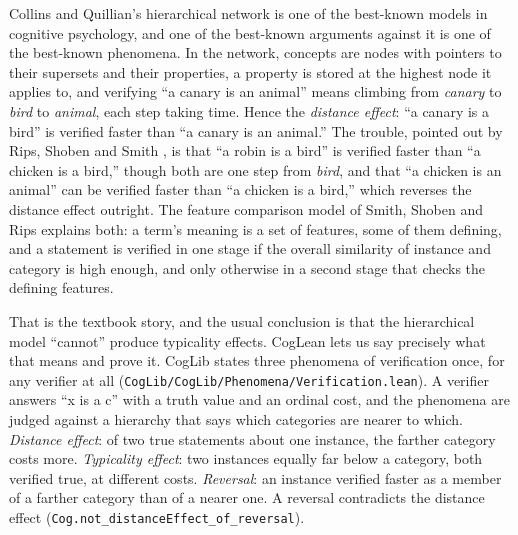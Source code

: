 \documentclass[11pt]{article}
\newcommand{\code}[1]{\texttt{#1}}
\newcommand{\lean}[1]{\texttt{#1}}
\begin{document}
Collins and Quillian's hierarchical network \citep{collins1969} is one
of the best-known models in cognitive psychology, and one of the
best-known arguments against it is one of the best-known phenomena. In
the network, concepts are nodes with pointers to their supersets and
their properties, a property is stored at the highest node it applies
to, and verifying ``a canary is an animal'' means climbing from
\emph{canary} to \emph{bird} to \emph{animal}, each step taking time.
Hence the \emph{distance effect}: ``a canary is a bird'' is verified
faster than ``a canary is an animal.'' The trouble, pointed out by
Rips, Shoben and Smith \citep{rips1973,smith1974}, is that ``a robin
is a bird'' is verified faster than ``a chicken is a bird,'' though
both are one step from \emph{bird}, and that ``a chicken is an animal''
can be verified faster than ``a chicken is a bird,'' which reverses the
distance effect outright. The feature comparison model of Smith,
Shoben and Rips explains both: a term's meaning is a set of features,
some of them defining, and a statement is verified in one stage if the
overall similarity of instance and category is high enough, and only
otherwise in a second stage that checks the defining features.

That is the textbook story, and the usual conclusion is that the
hierarchical model ``cannot'' produce typicality effects. CogLean lets
us say precisely what that means and prove it. CogLib states three
phenomena of verification once, for any verifier at all
(\code{CogLib/CogLib/Phenomena/Verification.lean}). A verifier answers
``x is a c'' with a truth value and an ordinal cost, and the phenomena
are judged against a hierarchy that says which categories are nearer
to which. \emph{Distance effect}: of two true statements about one
instance, the farther category costs more. \emph{Typicality effect}:
two instances equally far below a category, both verified true, at
different costs. \emph{Reversal}: an instance verified faster as a
member of a farther category than of a nearer one. A reversal
contradicts the distance effect (\lean{Cog.not\_distanceEffect\_of\_reversal}).
\end{document}
